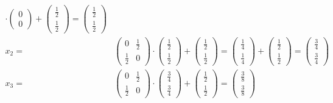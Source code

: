 \documentclass[a4paper,10pt]{article}
\begin{document}
\begin{enumerate}[a)]
\begin{align*}
		\cdot
		\begin{pmatrix}
		0\\
		0
		\end{pmatrix}
		+
		\begin{pmatrix}
		\frac{1}{2}\\[2pt]
		\frac{1}{2}
		\end{pmatrix}
		=
		\begin{pmatrix}
		\frac{1}{2}\\[2pt]
		\frac{1}{2}
		\end{pmatrix}\\
		x_2 = &
		\begin{pmatrix}
		0 & \frac{1}{2}\\[2pt]
		\frac{1}{2} & 0
		\end{pmatrix} 
		\cdot
		\begin{pmatrix}
		\frac{1}{2}\\[2pt]
		\frac{1}{2}
		\end{pmatrix}
		+
		\begin{pmatrix}
		\frac{1}{2}\\[2pt]
		\frac{1}{2}
		\end{pmatrix}
		=
		\begin{pmatrix}
		\frac{1}{4}\\[2pt]
		\frac{1}{4}
		\end{pmatrix}
		+
		\begin{pmatrix}
		\frac{1}{2}\\[2pt]
		\frac{1}{2}
		\end{pmatrix}
		=
		\begin{pmatrix}
		\frac{3}{4}\\[2pt]
		\frac{3}{4}
		\end{pmatrix}\\
		x_3 = &
		\begin{pmatrix}
		0 & \frac{1}{2}\\[2pt]
		\frac{1}{2} & 0
		\end{pmatrix} 
		\cdot
		\begin{pmatrix}
		\frac{3}{4}\\[2pt]
		\frac{3}{4}
		\end{pmatrix}
		+
		\begin{pmatrix}
		\frac{1}{2}\\[2pt]
		\frac{1}{2}
		\end{pmatrix}
		=
		\begin{pmatrix}
		\frac{3}{8}\\[2pt]
		\frac{3}{8}
		\end{pmatrix}

\end{align*}
\end{enumerate}
\end{document}
